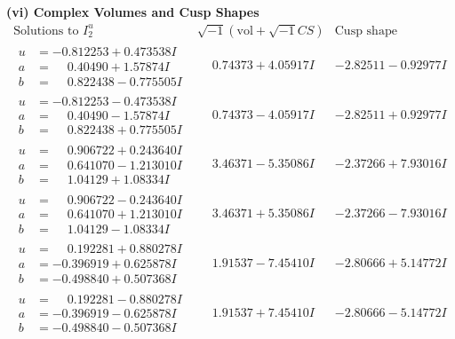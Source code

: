 \documentclass[1p]{elsarticle_modified}
\theoremstyle{definition}
\newcommand{\I}{\sqrt{-1}}
\begin{document}
\newpage\flushleft \textbf{(vi) Complex Volumes and Cusp Shapes}
$$\begin{array}{c|c|c}  
\text{Solutions to }I^u_{2}& \I (\text{vol} + \sqrt{-1}CS) & \text{Cusp shape}\\
 \hline 
\begin{aligned}
u &= -0.812253 + 0.473538 I \\
a &= \phantom{-}0.40490 + 1.57874 I \\
b &= \phantom{-}0.822438 - 0.775505 I\end{aligned}
 & \phantom{-}0.74373 + 4.05917 I & -2.82511 - 0.92977 I \\ \hline\begin{aligned}
u &= -0.812253 - 0.473538 I \\
a &= \phantom{-}0.40490 - 1.57874 I \\
b &= \phantom{-}0.822438 + 0.775505 I\end{aligned}
 & \phantom{-}0.74373 - 4.05917 I & -2.82511 + 0.92977 I \\ \hline\begin{aligned}
u &= \phantom{-}0.906722 + 0.243640 I \\
a &= \phantom{-}0.641070 - 1.213010 I \\
b &= \phantom{-}1.04129 + 1.08334 I\end{aligned}
 & \phantom{-}3.46371 - 5.35086 I & -2.37266 + 7.93016 I \\ \hline\begin{aligned}
u &= \phantom{-}0.906722 - 0.243640 I \\
a &= \phantom{-}0.641070 + 1.213010 I \\
b &= \phantom{-}1.04129 - 1.08334 I\end{aligned}
 & \phantom{-}3.46371 + 5.35086 I & -2.37266 - 7.93016 I \\ \hline\begin{aligned}
u &= \phantom{-}0.192281 + 0.880278 I \\
a &= -0.396919 + 0.625878 I \\
b &= -0.498840 + 0.507368 I\end{aligned}
 & \phantom{-}1.91537 - 7.45410 I & -2.80666 + 5.14772 I \\ \hline\begin{aligned}
u &= \phantom{-}0.192281 - 0.880278 I \\
a &= -0.396919 - 0.625878 I \\
b &= -0.498840 - 0.507368 I\end{aligned}
 & \phantom{-}1.91537 + 7.45410 I & -2.80666 - 5.14772 I \\ \hline\begin{aligned}

\end{aligned}
\end{array}$$
\end{document}
